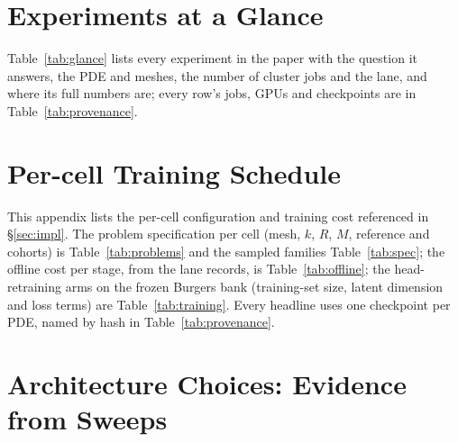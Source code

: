 \section{Experiments at a Glance}
\label{app:glance}
Table~\ref{tab:glance} lists every experiment in the paper with the
question it answers, the PDE and meshes, the number of cluster jobs and
the lane, and where its full numbers are; every row's jobs, GPUs and
checkpoints are in Table~\ref{tab:provenance}.

\begin{table}[h]
\centering
\caption{Experiments at a glance: one row per experiment, the question it
answers, the PDE and meshes, the number of cluster jobs (distinct job ids
in Table~\ref{tab:provenance}) and the lane, and where the full numbers
are.}
\label{tab:glance}

\end{table}



\section{Per-cell Training Schedule}
\label{app:training-schedule}

This appendix lists the per-cell configuration and training cost referenced in
\S\ref{sec:impl}. The problem specification per cell (mesh, $k$, $R$, $M$,
reference and cohorts) is Table~\ref{tab:problems} and the sampled families
Table~\ref{tab:spec}; the offline cost per stage, from the lane records, is
Table~\ref{tab:offline}; the head-retraining arms on the frozen Burgers bank
(training-set size, latent dimension and loss terms) are Table~\ref{tab:training}.
Every headline uses one checkpoint per PDE, named by hash in
Table~\ref{tab:provenance}.

\section{Architecture Choices: Evidence from Sweeps}
\label{app:arch}

